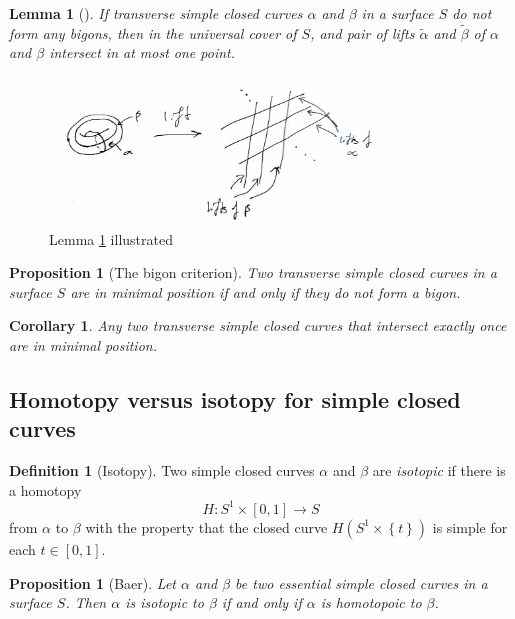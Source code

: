 \documentclass[reqno]{amsart}
\newtheorem{lemma}[theorem]{Lemma}
\newtheorem{proposition}[theorem]{Proposition}
\newtheorem{corollary}[theorem]{Corollary}
\theoremstyle{definition}
\newtheorem{definition}[theorem]{Definition}
\theoremstyle{remark}
\begin{document}
\begin{lemma}[]\label{lemma-intersections-of-lifts}
    If transverse simple closed curves $\alpha$ and $\beta$ in
    a surface $S$ do not form any bigons, then in the
    universal cover of $S$, and pair of lifts
    $\tilde{\alpha}$ and $\tilde{\beta}$ of $\alpha$ and $\beta$ 
    intersect in at most one point.
\end{lemma}

\begin{figure}[h]
    \centering
    \includegraphics[width=0.8\textwidth]{lemma-1-8.jpg}
    \caption{Lemma \ref{lemma-intersections-of-lifts} illustrated}
    \label{fig:lemma-1-8-jpg}
\end{figure}


\begin{proposition}[The bigon criterion]
    Two transverse simple closed curves in a surface $S$ are in
    minimal position if and only if they do not form
    a bigon.
\end{proposition}

\begin{corollary}
    Any two transverse simple closed curves that intersect exactly once are in
    minimal position.
\end{corollary}

\subsection*{Homotopy versus isotopy for simple closed curves}

\begin{definition}[Isotopy]
    Two simple closed curves $\alpha$ and $\beta$ are \textit{isotopic}
    if there is a homotopy 
    \[
    H \colon S^{1} \times \left[ 0,1 \right] \to 
    S
    \] 
    from $\alpha$ to $\beta$ with the property that the closed
    curve $H \left( S^{1} \times \left\{ t \right\}  \right) $ 
    is simple for each $t \in \left[ 0,1 \right] $.
\end{definition}

\begin{proposition}[Baer]
    Let $\alpha$ and $\beta$ be two essential simple closed curves
    in a surface $S$. Then $\alpha$ is isotopic to $\beta$ if and
    only if $\alpha$ is homotopoic to $\beta$.
\end{proposition}
\end{document}
